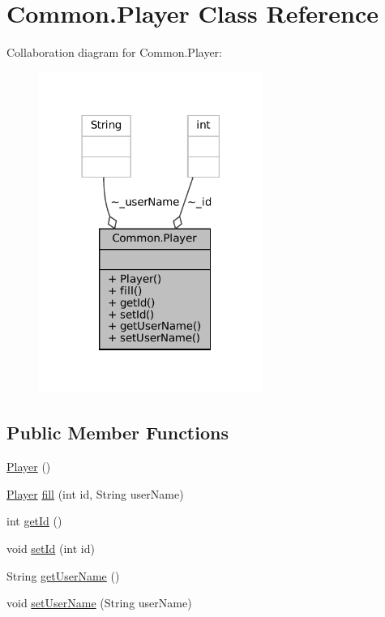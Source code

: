 \hypertarget{classCommon_1_1Player}{}\section{Common.\+Player Class Reference}
\label{classCommon_1_1Player}


Collaboration diagram for Common.\+Player\+:
\nopagebreak
\begin{figure}[H]
\begin{center}
\leavevmode
\includegraphics[width=207pt]{classCommon_1_1Player__coll__graph}
\end{center}
\end{figure}
\subsection*{Public Member Functions}
\begin{DoxyCompactItemize}
\item 
\mbox{\hyperlink{classCommon_1_1Player_a41dd3f4886d9e2a500c11be33ee73037}{Player}} ()
\item 
\mbox{\hyperlink{classCommon_1_1Player}{Player}} \mbox{\hyperlink{classCommon_1_1Player_a210c67d034b0b8ed9ead15c78a160829}{fill}} (int id, String user\+Name)
\item 
int \mbox{\hyperlink{classCommon_1_1Player_a713d057ef14b76119f3dfadc144ba150}{get\+Id}} ()
\item 
void \mbox{\hyperlink{classCommon_1_1Player_a400188d44456475d7864021917d9fe88}{set\+Id}} (int id)
\item 
String \mbox{\hyperlink{classCommon_1_1Player_a0b71351bbbea5a4624cafc7a9046b227}{get\+User\+Name}} ()
\item 
void \mbox{\hyperlink{classCommon_1_1Player_a89374a2bf8698d365493343ed49c7750}{set\+User\+Name}} (String user\+Name)
\end{DoxyCompactItemize}


